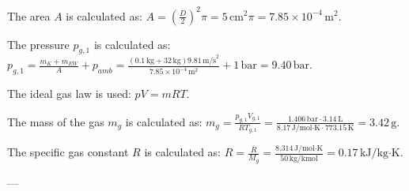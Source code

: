 The area \( A \) is calculated as:  
\( A = \left( \frac{D}{2} \right)^2 \pi = 5 \, \text{cm}^2 \pi = 7.85 \times 10^{-4} \, \text{m}^2 \).  

The pressure \( p_{g,1} \) is calculated as:  
\( p_{g,1} = \frac{m_K + m_{EW}}{A} + p_{amb} = \frac{(0.1 \, \text{kg} + 32 \, \text{kg}) 9.81 \, \text{m/s}^2}{7.85 \times 10^{-4} \, \text{m}^2} + 1 \, \text{bar} = 9.40 \, \text{bar} \).  

The ideal gas law is used:  
\( pV = mRT \).  

The mass of the gas \( m_g \) is calculated as:  
\( m_g = \frac{p_{g,1} V_{g,1}}{R T_{g,1}} = \frac{1.406 \, \text{bar} \cdot 3.14 \, \text{L}}{8.17 \, \text{J/mol·K} \cdot 773.15 \, \text{K}} = 3.42 \, \text{g} \).  

The specific gas constant \( R \) is calculated as:  
\( R = \frac{\bar{R}}{M_g} = \frac{8.314 \, \text{J/mol·K}}{50 \, \text{kg/kmol}} = 0.17 \, \text{kJ/kg·K} \).  

---